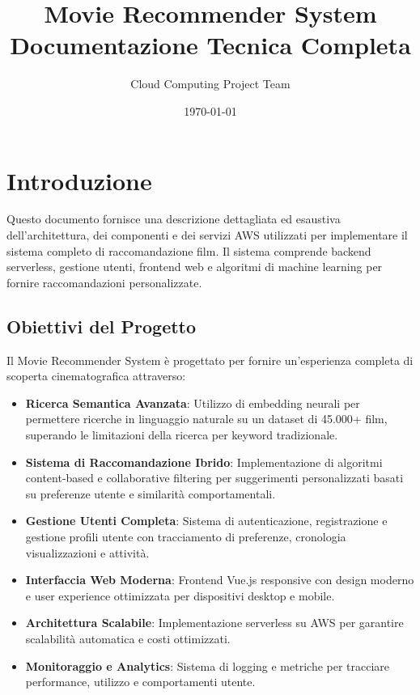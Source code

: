 \documentclass[11pt,a4paper]{article}
\title{\Huge Movie Recommender System\\[0.5cm] \Large Documentazione Tecnica Completa}
\author{Cloud Computing Project Team}
\date{\today}
\begin{document}
\maketitle
\tableofcontents
\newpage

\section{Introduzione}
Questo documento fornisce una descrizione dettagliata ed esaustiva dell'architettura, dei componenti e dei servizi AWS utilizzati per implementare il sistema completo di raccomandazione film. Il sistema comprende backend serverless, gestione utenti, frontend web e algoritmi di machine learning per fornire raccomandazioni personalizzate.

\subsection{Obiettivi del Progetto}
Il Movie Recommender System è progettato per fornire un'esperienza completa di scoperta cinematografica attraverso:

\begin{itemize}[itemsep=0.5em]
  \item \textbf{Ricerca Semantica Avanzata}: Utilizzo di embedding neurali per permettere ricerche in linguaggio naturale su un dataset di 45.000+ film, superando le limitazioni della ricerca per keyword tradizionale.
  \item \textbf{Sistema di Raccomandazione Ibrido}: Implementazione di algoritmi content-based e collaborative filtering per suggerimenti personalizzati basati su preferenze utente e similarità comportamentali.
  \item \textbf{Gestione Utenti Completa}: Sistema di autenticazione, registrazione e gestione profili utente con tracciamento di preferenze, cronologia visualizzazioni e attività.
  \item \textbf{Interfaccia Web Moderna}: Frontend Vue.js responsive con design moderno e user experience ottimizzata per dispositivi desktop e mobile.
  \item \textbf{Architettura Scalabile}: Implementazione serverless su AWS per garantire scalabilità automatica e costi ottimizzati.
  \item \textbf{Monitoraggio e Analytics}: Sistema di logging e metriche per tracciare performance, utilizzo e comportamenti utente.
\end{itemize}
\end{document}
